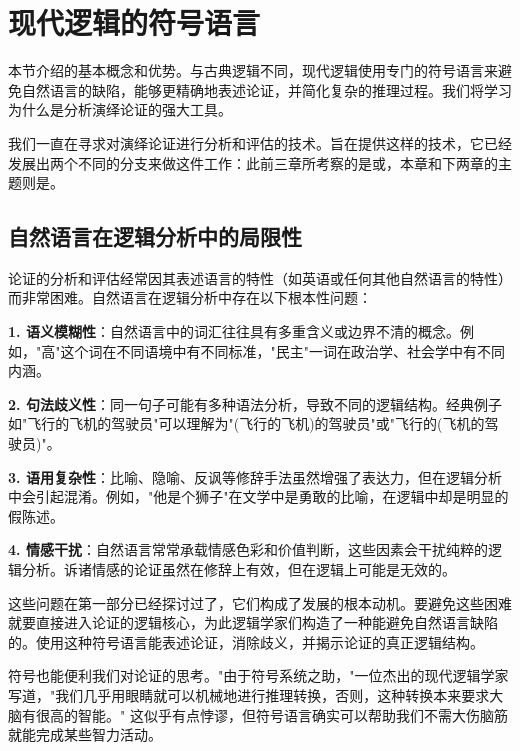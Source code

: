 \section{现代逻辑的符号语言}

\begin{logicbox}[title=引言]
本节介绍的基本概念和优势。与古典逻辑不同，现代逻辑使用专门的符号语言来避免自然语言的缺陷，能够更精确地表述论证，并简化复杂的推理过程。我们将学习为什么是分析演绎论证的强大工具。
\end{logicbox}

我们一直在寻求对演绎论证进行分析和评估的技术。旨在提供这样的技术，它已经发展出两个不同的分支来做这件工作：此前三章所考察的是或，本章和下两章的主题则是。

\subsection{自然语言在逻辑分析中的局限性}

论证的分析和评估经常因其表述语言的特性（如英语或任何其他自然语言的特性）而非常困难。自然语言在逻辑分析中存在以下根本性问题：

\begin{theorembox}[title=自然语言的四大逻辑缺陷]
\textbf{1. 语义模糊性}：自然语言中的词汇往往具有多重含义或边界不清的概念。例如，"高"这个词在不同语境中有不同标准，"民主"一词在政治学、社会学中有不同内涵。

\textbf{2. 句法歧义性}：同一句子可能有多种语法分析，导致不同的逻辑结构。经典例子如"飞行的飞机的驾驶员"可以理解为"(飞行的飞机)的驾驶员"或"飞行的(飞机的驾驶员)"。

\textbf{3. 语用复杂性}：比喻、隐喻、反讽等修辞手法虽然增强了表达力，但在逻辑分析中会引起混淆。例如，"他是个狮子"在文学中是勇敢的比喻，在逻辑中却是明显的假陈述。

\textbf{4. 情感干扰}：自然语言常常承载情感色彩和价值判断，这些因素会干扰纯粹的逻辑分析。诉诸情感的论证虽然在修辞上有效，但在逻辑上可能是无效的。
\end{theorembox}

这些问题在第一部分已经探讨过了，它们构成了发展的根本动机。要避免这些困难就要直接进入论证的逻辑核心，为此逻辑学家们构造了一种能避免自然语言缺陷的。使用这种符号语言能表述论证，消除歧义，并揭示论证的真正逻辑结构。

\begin{examplebox}[title=符号语言的优势]
符号也能便利我们对论证的思考。"由于符号系统之助，"一位杰出的现代逻辑学家写道，"我们几乎用眼睛就可以机械地进行推理转换，否则，这种转换本来要求大脑有很高的智能。"\cite{quine1940} 这似乎有点悖谬，但符号语言确实可以帮助我们不需大伤脑筋就能完成某些智力活动。
\end{examplebox}

